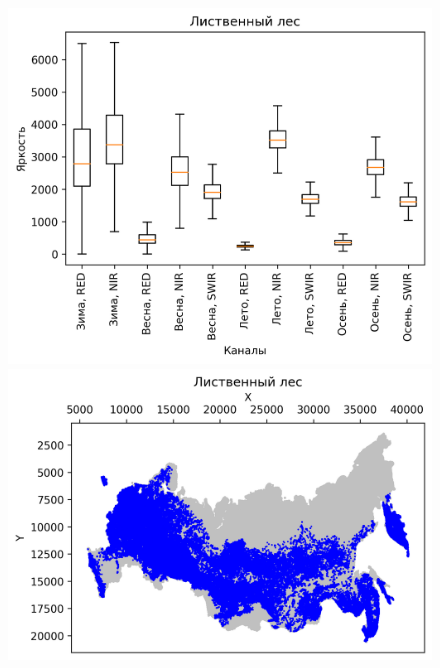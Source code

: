 \documentclass[14pt, a4paper, oneside]{extarticle}
\begin{document}
\begin{figure}[H]
    \centering
    \includegraphics[]{class-3-boxplot}
    \includegraphics[]{class-3-map}
\end{figure}
\end{document}
